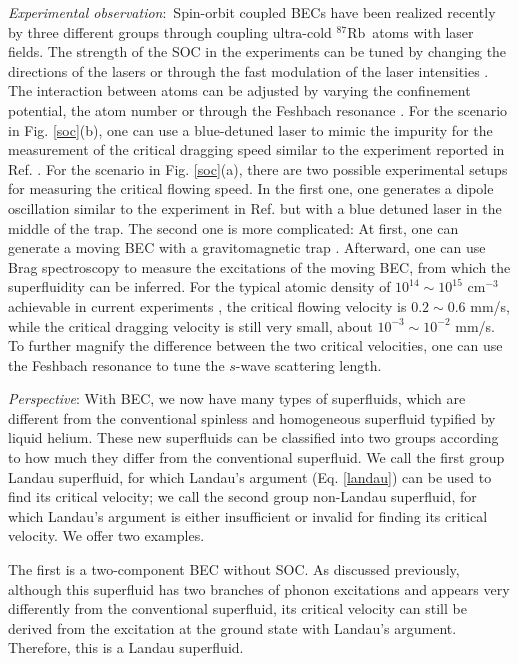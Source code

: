 \documentclass[doublecol]{epl2}
\begin{document}
\textit{Experimental observation}:~Spin-orbit coupled BECs
have been realized recently by three different groups \cite{lin2,fu,pan}
through coupling ultra-cold $^{87}$Rb~atoms with laser fields. The strength
of the SOC in the experiments can be tuned by changing the directions of the
lasers \cite{lin2,fu,pan} or through the fast modulation of the laser
intensities \cite{yongping2}. The interaction between atoms can be adjusted
by varying the confinement potential, the atom number or through the
Feshbach resonance \cite{Chin}. For the scenario in Fig. \ref{soc}(b), one
can use a blue-detuned laser to mimic the impurity  for the measurement of the
critical dragging speed similar to the experiment reported in Ref. \cite{raman}.
For the scenario in Fig. \ref{soc}(a), there are two possible experimental setups for
measuring the critical flowing speed.  In the first one, one generates
a dipole oscillation similar to the experiment in Ref. \cite{pan} but with a blue
detuned laser in the middle of the trap. The second one is more complicated:
At first, one can generate a moving BEC with a gravitomagnetic
trap \cite{motion}. Afterward, one can use Brag spectroscopy \cite%
{brag1,brag2} to measure the excitations of the moving BEC, from which the
superfluidity can be inferred. For the typical atomic density
of $10^{14}\sim10^{15}$ cm$^{-3}$ achievable in current experiments \cite{raman}, the critical
flowing velocity is $0.2\sim0.6$ mm/s, while the critical dragging velocity is still very small, about
$10^{-3}\sim10^{-2}$ mm/s. To further magnify the difference between the two critical
velocities, one can use the Feshbach resonance to tune the $s$-wave scattering
length.

\textit{Perspective}: With BEC, we now have many types of superfluids, which are different from
the conventional spinless and homogeneous superfluid typified by liquid helium.
These new superfluids can be classified into two groups according
to how much they differ from the conventional superfluid.  We call the first group Landau
superfluid, for which Landau's argument (Eq. \ref{landau}) can be used to find its critical
velocity; we call the second group non-Landau superfluid, for which Landau's argument
is either insufficient or invalid for finding its critical velocity. We offer two examples.

The first is a two-component BEC without SOC. As discussed previously,
although this superfluid has two branches of phonon excitations and appears
very differently from the conventional superfluid, its critical velocity can still
be derived from the excitation at the ground state with Landau's argument. Therefore,
this is a Landau superfluid.
\end{document}
